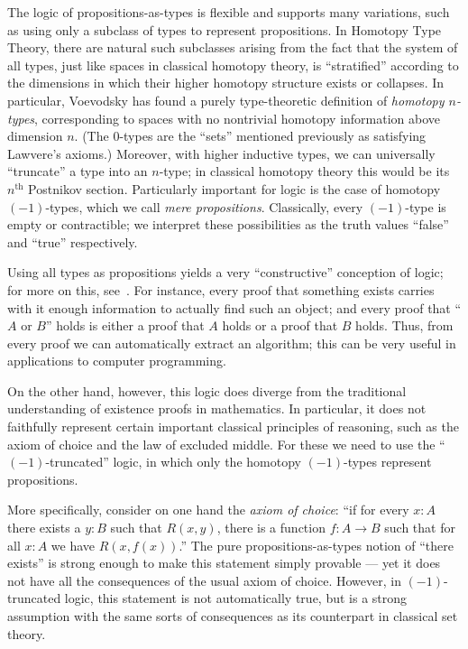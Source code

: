 The logic of propositions-as-types is flexible and supports many variations, such as using only a subclass of types to represent propositions.
In Homotopy Type Theory, there are natural such subclasses arising from the fact that the system of all types, just like spaces in classical homotopy theory, is ``stratified'' according to the dimensions in which their higher homotopy structure exists or collapses.
In particular, Voevodsky has found a purely type-theoretic definition of \emph{homotopy $n$-types}, corresponding to spaces with no nontrivial homotopy information above dimension $n$.
(The $0$-types are the ``sets'' mentioned previously as satisfying Lawvere's axioms.)
Moreover, with higher inductive types, we can universally ``truncate'' a type into an $n$-type; in classical homotopy theory this would be its $n^{\mathrm{th}}$ Postnikov section.
Particularly important for logic is the case of homotopy $(-1)$-types, which we call \emph{mere propositions}.
Classically, every $(-1)$-type is empty or contractible; we interpret these possibilities as the truth values ``false'' and ``true'' respectively.

Using all types as propositions yields a very ``constructive'' conception of logic; for more on this, see~\cite{kolmogorov,TroelstraI,TroelstraII}.
For instance, every proof that something exists carries with it enough information to actually find such an object; and every proof that ``$A$ or $B$'' holds is either a proof that $A$ holds or a proof that $B$ holds.
Thus, from every proof we can automatically extract an algorithm;  this can be very useful in applications to computer programming.

On the other hand, however, this logic does diverge from the traditional understanding of existence proofs in mathematics.
In particular, it does not faithfully represent certain important classical principles of reasoning, such as the axiom of choice and the law of excluded middle.
For these we need to use the ``$(-1)$-truncated'' logic, in which only the homotopy $(-1)$-types represent propositions.

%
More specifically, consider on one hand the \emph{axiom of choice}: ``if for every $x: A$ there exists a $y:B$ such that $R(x,y)$, there is a function $f : A\to B$ such that for all $x:A$ we have $R(x, f(x))$.''
The pure propositions-as-types notion of ``there exists'' is strong enough to make this statement simply provable --- yet it does not have all the consequences of the usual axiom of choice.
However, in $(-1)$-truncated logic, this statement is not automatically true, but is a strong assumption with the same sorts of consequences as its counterpart in classical set theory.

